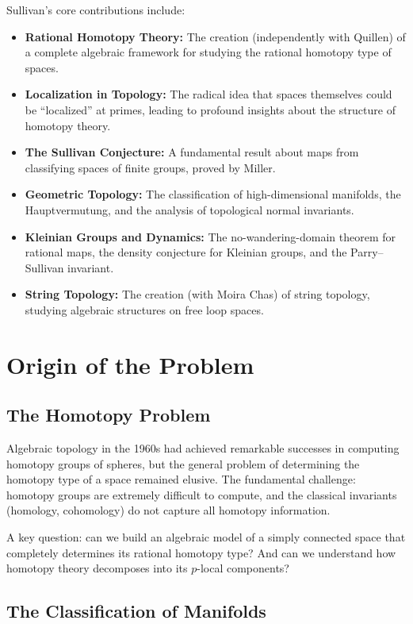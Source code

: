 Sullivan's core contributions include:
\begin{itemize}
    \item \textbf{Rational Homotopy Theory:} The creation (independently with Quillen) of a complete algebraic framework for studying the rational homotopy type of spaces.
    \item \textbf{Localization in Topology:} The radical idea that spaces themselves could be ``localized'' at primes, leading to profound insights about the structure of homotopy theory.
    \item \textbf{The Sullivan Conjecture:} A fundamental result about maps from classifying spaces of finite groups, proved by Miller.
    \item \textbf{Geometric Topology:} The classification of high-dimensional manifolds, the Hauptvermutung, and the analysis of topological normal invariants.
    \item \textbf{Kleinian Groups and Dynamics:} The no-wandering-domain theorem for rational maps, the density conjecture for Kleinian groups, and the Parry--Sullivan invariant.
    \item \textbf{String Topology:} The creation (with Moira Chas) of string topology, studying algebraic structures on free loop spaces.
\end{itemize}

\section{Origin of the Problem}

\subsection{The Homotopy Problem}

Algebraic topology in the 1960s had achieved remarkable successes in computing homotopy groups of spheres, but the general problem of determining the homotopy type of a space remained elusive. The fundamental challenge: homotopy groups are extremely difficult to compute, and the classical invariants (homology, cohomology) do not capture all homotopy information.

A key question: can we build an algebraic model of a simply connected space that completely determines its rational homotopy type? And can we understand how homotopy theory decomposes into its $p$-local components?

\subsection{The Classification of Manifolds}

